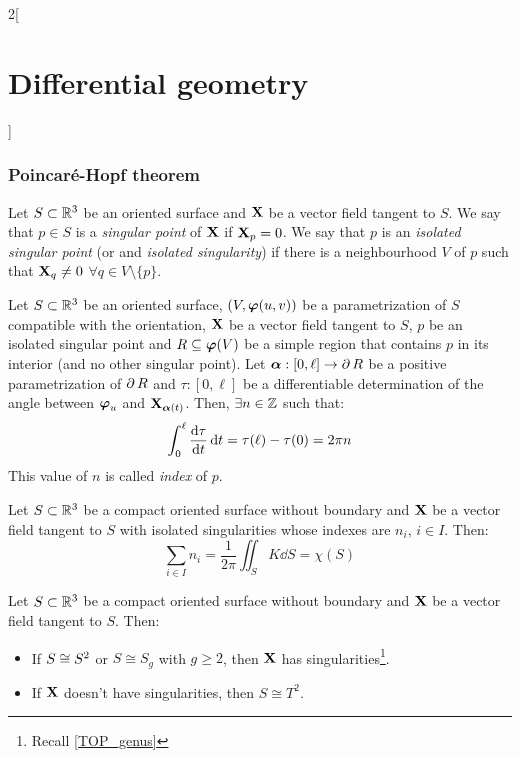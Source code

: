 \documentclass[../../../main_math.tex]{subfiles}
\begin{document}
\begin{multicols}{2}[\section{Differential geometry}]
  \subsubsection{Poincaré-Hopf theorem}
  \begin{definition}
    Let $S\subset\RR^3$ be an oriented surface and $\vf{X}$ be a vector field tangent to $S$. We say that $p\in S$ is a \emph{singular point} of $\vf{X}$ if $\vf{X}_p=0$. We say that $p$ is an \emph{isolated singular point} (or and \emph{isolated singularity}) if there is a neighbourhood $V$ of $p$ such that $\vf{X}_q\ne 0$ $\forall q\in V\setminus\{p\}$.
  \end{definition}
  \begin{proposition}
    Let $S\subset\RR^3$ be an oriented surface, $(V,\vf\varphi(u,v))$ be a parametrization of $S$ compatible with the orientation, $\vf{X}$ be a vector field tangent to $S$, $p$ be an isolated singular point and $R\subseteq \vf\varphi(V)$ be a simple region that contains $p$ in its interior (and no other singular point). Let $\vf\alpha:[0,\ell]\rightarrow\Fr{R}$ be a positive parametrization of $\Fr{R}$ and $\tau:[0,\ell]$ be a differentiable determination of the angle between $\vf\varphi_u$ and $\vf{X}_{\vf\alpha(t)}$. Then, $\exists n\in\ZZ$ such that: $$\int_0^\ell\dv{\tau}{t}\dd{t}=\tau(\ell)-\tau(0)=2\pi n$$
    This value of $n$ is called \emph{index} of $p$.
  \end{proposition}
  \begin{theorem}
    Let $S\subset\RR^3$ be a compact oriented surface without boundary and $\vf{X}$ be a vector field tangent to $S$ with isolated singularities whose indexes are $n_i$, $i\in I$. Then: $$\sum_{i\in I}n_i=\frac{1}{2\pi}\iint_SK\dd{S}=\chi(S)$$
  \end{theorem}
  \begin{corollary}
    Let $S\subset\RR^3$ be a compact oriented surface without boundary and $\vf{X}$ be a vector field tangent to $S$. Then:
    \begin{itemize}
      \item If $S\cong \S^2$ or $S\cong S_g$ with $g\geq 2$, then $\vf{X}$ has singularities\footnote{Recall \cref{TOP_genus}}.
      \item If $\vf{X}$ doesn't have singularities, then $S\cong T^2$.
    \end{itemize}
  \end{corollary}
\end{multicols}
\end{document}
